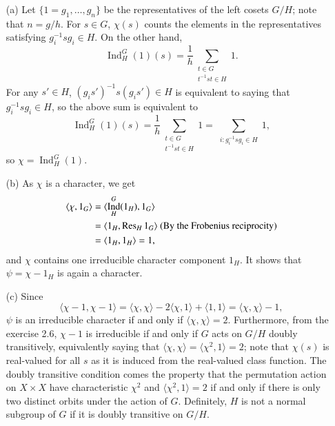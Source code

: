 \documentclass[a4paper, 12pt]{article}
\theoremstyle{Mydefinition}
\theoremstyle{Mytheorem}
\DeclareMathOperator{\Ind}{Ind}
\begin{document}
\begin{enumerate}
    \item[(a)] Let $\{1=g_1, \ldots, g_{n}\}$ be the representatives of the left cosets $G/H$; note that $n=g/h$. For $s\in G$, $\chi(s)$ counts the elements in the representatives satisfying $g_i^{-1}sg_i\in H$. On the other hand,
    \begin{equation}
        \Ind_H^G(1)(s) = \frac{1}{h}\sum_{\substack{t\in G\\ t^{-1}st\in H}} 1.
    \end{equation}
    For any $s'\in H$, $(g_is')^{-1}s(g_is')\in H$ is equivalent to saying that $g_i^{-1}sg_i\in H$, so the above sum is equivalent to
    \begin{equation}
        \Ind_H^G(1)(s) = \frac{1}{h}\sum_{\substack{t\in G\\ t^{-1}st\in H}} 1 = \sum_{\substack{i:g_i^{-1}sg_i\in H}} 1,
    \end{equation}
    so $\chi = \Ind_H^G(1)$.
    \item[(b)] As $\chi$ is a character, we get
    \begin{equation}
    \begin{split}
        \langle \chi, 1_G\rangle &= \langle \Ind_H^G(1_H), 1_G\rangle\\
        &= \langle 1_H, \Res_H 1_G\rangle~(\textrm{By the Frobenius reciprocity})\\
        &=\langle 1_H, 1_H\rangle = 1,
    \end{split}
    \end{equation}
    and $\chi$ contains one irreducible character component $1_H$. It shows that $\psi = \chi- 1_H$ is again a character.
    \item[(c)] Since 
    \begin{equation}
        \langle \chi-1, \chi-1\rangle = \langle \chi, \chi\rangle - 2\langle \chi, 1\rangle + \langle 1, 1\rangle = \langle \chi,\chi\rangle -1,
    \end{equation}
    $\psi$ is an irreducible character if and only if $\langle \chi, \chi\rangle = 2$. Furthermore, from the exercise 2.6, $\chi-1$ is irreducible if and only if $G$ acts on $G/H$ doubly transitively, equivalently saying that $\langle \chi, \chi\rangle = \langle \chi^2, 1\rangle = 2$; note that $\chi(s)$ is real-valued for all $s$ as it is induced from the real-valued class function. The doubly transitive condition comes the property that the permutation action on $X\times X$ have characteristic $\chi^2$ and $\langle \chi^2, 1\rangle=2$ if and only if there is only two distinct orbits under the action of $G$. Definitely, $H$ is not a normal subgroup of $G$ if it is doubly transitive on $G/H$.
\end{enumerate}
\end{document}

